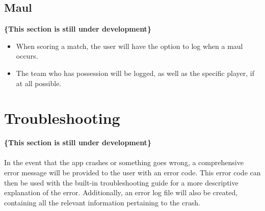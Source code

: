 \documentclass[hidelinks,a4paper,12pt]{article}
\begin{document}
	\subsection{Maul}
	{\bfseries\{This section is still under development\}}
		\begin{itemize}
			\item When scoring a match, the user will have the option to log when a maul occurs.
			\item The team who has possession will be logged, as well as the specific player, if at all possible.
		\end{itemize}

\section{Troubleshooting}
	{\bfseries\{This section is still under development\}}\\ \\
	In the event that the app crashes or something goes wrong, a comprehensive error message will be provided to the user with an error code. This error code can then be used with the built-in troubleshooting guide for a more descriptive explanation of the error. Additionally, an error log file will also be created, containing all the relevant information pertaining to the crash.
		
\end{document}

